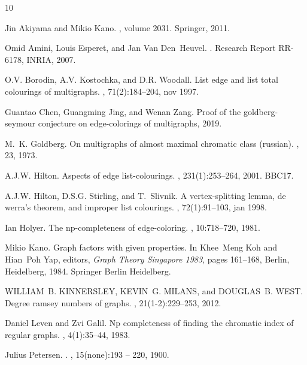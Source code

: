 \documentclass[11pt]{article}
\begin{document}
\begin{thebibliography}{10}

Jin Akiyama and Mikio Kano.
, volume 2031.
\newblock Springer, 2011.

Omid Amini, Louis Esperet, and Jan Van Den~Heuvel.
.
\newblock Research Report RR-6178, {INRIA}, 2007.

O.V. Borodin, A.V. Kostochka, and D.R. Woodall.
\newblock List edge and list total colourings of multigraphs.
, 71(2):184–204, nov 1997.

Guantao Chen, Guangming Jing, and Wenan Zang.
\newblock Proof of the goldberg-seymour conjecture on edge-colorings of
  multigraphs, 2019.

M.~K. Goldberg.
\newblock On multigraphs of almost maximal chromatic class (russian).
, 23, 1973.

A.J.W. Hilton.
\newblock Aspects of edge list-colourings.
, 231(1):253--264, 2001.
\newblock BBC17.

A.J.W. Hilton, D.S.G. Stirling, and T.~Slivnik.
\newblock A vertex-splitting lemma, de werra's theorem, and improper list
  colourings.
, 72(1):91–103, jan 1998.

Ian Holyer.
\newblock The np-completeness of edge-coloring.
, 10:718--720, 1981.

Mikio Kano.
\newblock Graph factors with given properties.
\newblock In Khee~Meng Koh and Hian~Poh Yap, editors, {\em Graph Theory
  Singapore 1983}, pages 161--168, Berlin, Heidelberg, 1984. Springer Berlin
  Heidelberg.

WILLIAM~B. KINNERSLEY, KEVIN~G. MILANS, and DOUGLAS~B. WEST.
\newblock Degree ramsey numbers of graphs.
, 21(1-2):229–253,
  2012.

Daniel Leven and Zvi Galil.
\newblock Np completeness of finding the chromatic index of regular graphs.
, 4(1):35--44, 1983.

Julius Petersen.
.
, 15(none):193 -- 220, 1900.


\end{thebibliography}
\end{document}
